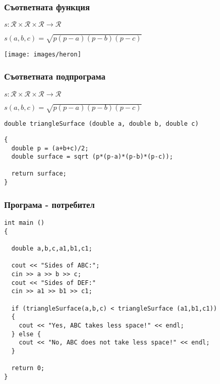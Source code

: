 \documentclass{beamer}
\begin{document}
\begin{frame}[fragile]
\frametitle{Съответната функция}

$s:\mathcal{R}\times\mathcal{R}\times\mathcal{R} \rightarrow \mathcal{R}$


$s(a,b,c)=\sqrt{p(p-a)(p-b)(p-c)}$


\begin{center}
\texttt{[image: images/heron]}
\end{center}


\end{frame}
\begin{frame}[fragile]
\frametitle{Съответната подпрограма}

$s:\mathcal{R}\times\mathcal{R}\times\mathcal{R} \rightarrow \mathcal{R}$

$s(a,b,c)=\sqrt{p(p-a)(p-b)(p-c)}$

\pause

\begin{flushleft}
\begin{lstlisting}
double triangleSurface (double a, double b, double c)
\end{lstlisting}\pause\begin{lstlisting}
{
  double p = (a+b+c)/2;
  double surface = sqrt (p*(p-a)*(p-b)*(p-c));

  return surface;
}
\end{lstlisting}
\end{flushleft}


\end{frame}

\begin{frame}[fragile]
\frametitle{Програма - потребител}

\begin{flushleft}
\begin{lstlisting}
int main ()
{

  double a,b,c,a1,b1,c1;

  cout << "Sides of ABC:";
  cin >> a >> b >> c;
  cout << "Sides of DEF:"
  cin >> a1 >> b1 >> c1;

  if (triangleSurface(a,b,c) < triangleSurface (a1,b1,c1))
  {
    cout << "Yes, ABC takes less space!" << endl;
  } else {
    cout << "No, ABC does not take less space!" << endl;
  }

  return 0;
}
\end{lstlisting}
\end{flushleft}


\end{frame}
\end{document}
